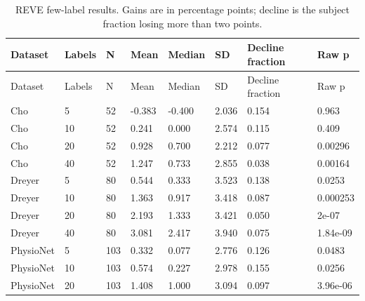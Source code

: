 \begin{longtable}{llllllll}
\caption{REVE few-label results. Gains are in percentage points; decline is the subject fraction losing more than two points.}\label{tab:cross_few_reve}\\
\toprule
Dataset & Labels & N & Mean & Median & SD & Decline fraction & Raw p \\
\midrule
\endfirsthead
\toprule
Dataset & Labels & N & Mean & Median & SD & Decline fraction & Raw p \\
\midrule
\endhead
Cho & 5 & 52 & -0.383 & -0.400 & 2.036 & 0.154 & 0.963 \\
Cho & 10 & 52 & 0.241 & 0.000 & 2.574 & 0.115 & 0.409 \\
Cho & 20 & 52 & 0.928 & 0.700 & 2.212 & 0.077 & 0.00296 \\
Cho & 40 & 52 & 1.247 & 0.733 & 2.855 & 0.038 & 0.00164 \\
Dreyer & 5 & 80 & 0.544 & 0.333 & 3.523 & 0.138 & 0.0253 \\
Dreyer & 10 & 80 & 1.363 & 0.917 & 3.418 & 0.087 & 0.000253 \\
Dreyer & 20 & 80 & 2.193 & 1.333 & 3.421 & 0.050 & 2e-07 \\
Dreyer & 40 & 80 & 3.081 & 2.417 & 3.940 & 0.075 & 1.84e-09 \\
PhysioNet & 5 & 103 & 0.332 & 0.077 & 2.776 & 0.126 & 0.0483 \\
PhysioNet & 10 & 103 & 0.574 & 0.227 & 2.978 & 0.155 & 0.0256 \\
PhysioNet & 20 & 103 & 1.408 & 1.000 & 3.094 & 0.097 & 3.96e-06 \\
\bottomrule
\end{longtable}
